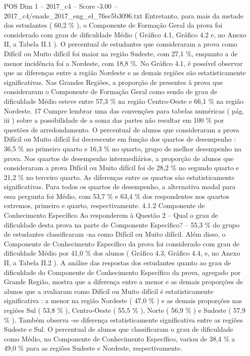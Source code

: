 \begin{textsample}{POS Dim 1 – 2017\_c4 – Score -3.00 – 2017\_c4/enade\_2017\_eng\_el\_76ec5b3096.txt}
Entretanto, para mais da metade dos estudantes ( 60,2 \% ), o Componente de Formação Geral da prova foi considerado com grau de dificuldade Médio ( Gráfico 4.1, Gráfico 4.2 e, no Anexo II, a Tabela II.1 ).
O percentual de estudantes que consideraram a prova como Difícil ou Muito difícil foi maior na região Sudeste, com 27,1 \%, enquanto a de menor incidência foi a Nordeste, com 18,8 \%.
No Gráfico 4.1, é possível observar que as diferenças entre a região Nordeste e as demais regiões são estatisticamente significativas.
Nas Grandes Regiões, a proporção de presentes à prova que consideraram o Componente de Formação Geral como sendo de grau de dificuldade Médio esteve entre 57,3 \% na região Centro-Oeste e 66,1 \% na região Nordeste. 17 Cumpre lembrar uma das convenções para tabelas numéricas ( pág. iii ) sobre a possibilidade de a soma das partes não resultar em 100 \% por questões de arredondamento.
O percentual de alunos que consideraram a prova Difícil ou Muito difícil foi decrescente em função dos quartos de desempenho : 36,5 \% no primeiro quarto e 16,3 \% no quarto, grupo de melhor desempenho na prova.
Nos quartos de desempenho intermediários, a proporção de alunos que consideraram a prova Difícil ou Muito difícil foi de 28,2 \% no segundo quarto e 21,2 \% no terceiro quarto.
As diferenças entre os quartos são estatisticamente significativas.
Para todos os quartos de desempenho, a alternativa modal para essa pergunta foi Médio, com 53,7 \% e 63,4 \% dos respondentes nos quartos extremos, primeiro e quarto, respectivamente. 4.1.2 Componente de Conhecimento Específico Ao responderem à Questão 2 – Qual o grau de dificuldade desta prova na parte de Componente Específico? – 55,3 \% do grupo de estudantes classificaram -na como Difícil ou Muito difícil.
Além disso, o Componente de Conhecimento Específico da prova foi considerado com grau de dificuldade Médio por 41,0 \% dos alunos ( Gráfico 4.3, Gráfico 4.4, e, no Anexo II, a Tabela II.2 ).
A análise das respostas dos estudantes quanto ao grau de dificuldade do Componente de Conhecimento Específico da prova, agregado por Grande Região, mostra que a diferença entre a menor e as demais proporções de alunos que a avaliaram como Difícil ou Muito difícil é estatisticamente significativa : a menor na região Nordeste ( 47,0 \% ) e as demais proporções nas regiões Sul ( 53,8 \% ), Centro-Oeste ( 55,5 \% ), Norte ( 56,9 \% ) e Sudeste ( 57,9 \% ).
Também observa -se diferença estatisticamente significativa entre as regiões Sudeste e Sul.
O percentual de alunos que classificaram o grau de dificuldade como Médio, no Componente de Conhecimento Específico, variou de 38,4 \% a 49,0 \% para as regiões Sudeste e Nordeste, respectivamente.

\end{textsample}

